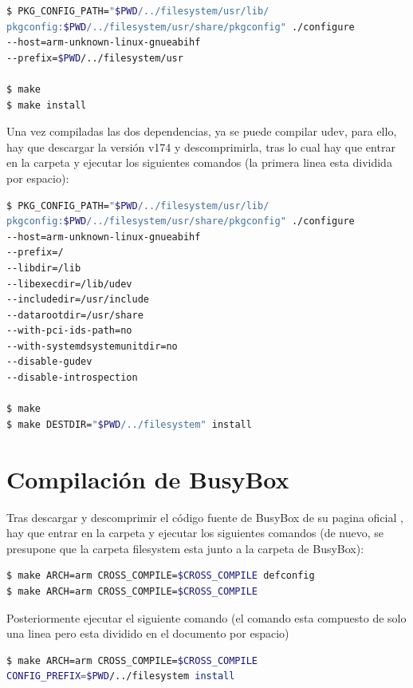 \documentclass{tfg}
\begin{document}
\clearpage

\begin{lstlisting}[language=bash,caption=Compilacion de usbutils]
$ PKG_CONFIG_PATH="$PWD/../filesystem/usr/lib/
pkgconfig:$PWD/../filesystem/usr/share/pkgconfig" ./configure
--host=arm-unknown-linux-gnueabihf
--prefix=$PWD/../filesystem/usr

$ make
$ make install
\end{lstlisting}

Una vez compiladas las dos dependencias, ya se puede compilar udev, para ello, hay que descargar la versión v174 y descomprimirla, tras lo cual hay que entrar en la carpeta y ejecutar los siguientes comandos (la primera linea esta dividida por espacio):

\begin{lstlisting}[language=bash,caption=Compilacion de udev]
$ PKG_CONFIG_PATH="$PWD/../filesystem/usr/lib/
pkgconfig:$PWD/../filesystem/usr/share/pkgconfig" ./configure
--host=arm-unknown-linux-gnueabihf
--prefix=/
--libdir=/lib
--libexecdir=/lib/udev
--includedir=/usr/include
--datarootdir=/usr/share
--with-pci-ids-path=no
--with-systemdsystemunitdir=no
--disable-gudev
--disable-introspection

$ make
$ make DESTDIR="$PWD/../filesystem" install
\end{lstlisting}

\section{Compilación de BusyBox}
Tras descargar y descomprimir el código fuente de BusyBox de su pagina oficial \cite{busybox}, hay que entrar en la carpeta y ejecutar
los siguientes comandos (de nuevo, se presupone que la carpeta filesystem esta junto a la carpeta de BusyBox):

\begin{lstlisting}[language=bash,caption=Compilacion de BusyBox (1)]
$ make ARCH=arm CROSS_COMPILE=$CROSS_COMPILE defconfig
$ make ARCH=arm CROSS_COMPILE=$CROSS_COMPILE
\end{lstlisting}

Posteriormente ejecutar el siguiente comando (el comando esta compuesto de solo una linea pero esta dividido en el documento por espacio)
\begin{lstlisting}[language=bash,caption=Compilacion de BusyBox (2)]
$ make ARCH=arm CROSS_COMPILE=$CROSS_COMPILE
CONFIG_PREFIX=$PWD/../filesystem install
\end{lstlisting}
%
\end{document}
